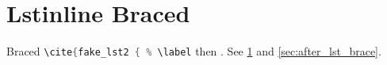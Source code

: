 \documentclass{article}
\begin{document}
\section{Lstinline Braced}\label{sec:lst_brace}
Braced \lstinline[language=C]{\cite{fake_lst2 { %
See \ref{sec:lst_brace} and \ref{sec:after_lst_brace}.


\end{document}
